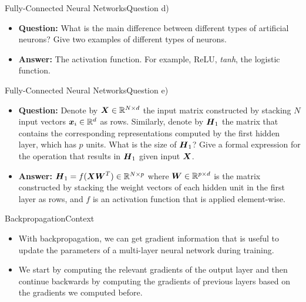\documentclass[t]{beamer}
\begin{document}
\begin{frame}{Fully-Connected Neural Networks}{Question d)}
    \begin{itemize}
        \item \textbf{Question:} What is the main difference between different
              types of artificial neurons? Give two examples of different types
              of neurons.
              \pause
        \item \textbf{Answer:} The activation function. For example, ReLU,
              \emph{tanh}, the logistic function.
    \end{itemize}
\end{frame}

\begin{frame}{Fully-Connected Neural Networks}{Question e)}
    \begin{itemize}
        \item \textbf{Question:} Denote by ${\boldsymbol{X}}\in\mathbb{R}^{N\times d}$ the input
              matrix constructed by stacking $N$ input vectors
              ${\boldsymbol{x}}_i\in\mathbb{R}^d$ as rows. Similarly, denote by ${\boldsymbol{H}}_1$ the
              matrix that contains the corresponding representations computed by
              the first hidden layer, which has $p$ units. What is the size of
              ${\boldsymbol{H}}_1$? Give a formal expression for the operation that results
              in ${\boldsymbol{H}}_1$ given input ${\boldsymbol{X}}$.
              \pause
        \item \textbf{Answer:} ${\boldsymbol{H}}_1=f({\boldsymbol{X}}{\boldsymbol{W}}^T)\in\mathbb{R}^{N\times p}$ where
              ${\boldsymbol{W}}\in\mathbb{R}^{p\times d}$ is the matrix constructed by stacking
              the weight vectors of each hidden unit in the first layer as rows,
              and $f$ is an activation function that is applied element-wise.
    \end{itemize}
\end{frame}

\begin{frame}{Backpropagation}{Context}
    \begin{itemize}
        \item With backpropagation, we can get gradient information that is
              useful to update the parameters of a multi-layer neural network
              during training.
        \item We start by computing the relevant gradients of the output layer
              and then continue backwards by computing the gradients of previous
              layers based on the gradients we computed before.
    \end{itemize}
\end{frame}
\end{document}
